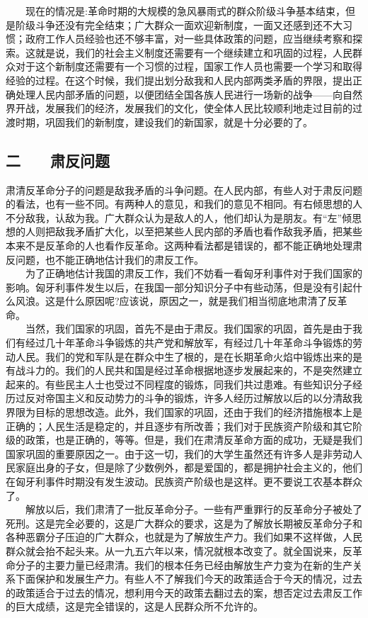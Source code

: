 \documentclass[cn,11pt,chinese]{elegantbook}
\def\myformat#1{\hfil\hfil #1}
\begin{document}
　　现在的情况是:革命时期的大规模的急风暴雨式的群众阶级斗争基本结束，但是阶级斗争还没有完全结束；广大群众一面欢迎新制度，一面又还感到还不大习惯；政府工作人员经验也还不够丰富，对一些具体政策的问题，应当继续考察和探索。这就是说，我们的社会主义制度还需要有一个继续建立和巩固的过程，人民群众对于这个新制度还需要有一个习惯的过程，国家工作人员也需要一个学习和取得经验的过程。在这个时候，我们提出划分敌我和人民内部两类矛盾的界限，提出正确处理人民内部矛盾的问题，以便团结全国各族人民进行一场新的战争——向自然界开战，发展我们的经济，发展我们的文化，使全体人民比较顺利地走过目前的过渡时期，巩固我们的新制度，建设我们的新国家，就是十分必要的了。\\
\subsection*{\myformat{二　　肃反问题}}
肃清反革命分子的问题是敌我矛盾的斗争问题。在人民内部，有些人对于肃反问题的看法，也有一些不同。有两种人的意见，和我们的意见不相同。有右倾思想的人不分敌我，认敌为我。广大群众认为是敌人的人，他们却认为是朋友。有“左”倾思想的人则把敌我矛盾扩大化，以至把某些人民内部的矛盾也看作敌我矛盾，把某些本来不是反革命的人也看作反革命。这两种看法都是错误的，都不能正确地处理肃反问题，也不能正确地估计我们的肃反工作。\\
　　为了正确地估计我国的肃反工作，我们不妨看一看匈牙利事件对于我们国家的影响。匈牙利事件发生以后，在我国一部分知识分子中有些动荡，但是没有引起什么风浪。这是什么原因呢?应该说，原因之一，就是我们相当彻底地肃清了反革命。\\
　　当然，我们国家的巩固，首先不是由于肃反。我们国家的巩固，首先是由于我们有经过几十年革命斗争锻炼的共产党和解放军，有经过几十年革命斗争锻炼的劳动人民。我们的党和军队是在群众中生了根的，是在长期革命火焰中锻炼出来的是有战斗力的。我们的人民共和国是经过革命根据地逐步发展起来的，不是突然建立起来的。有些民主人士也受过不同程度的锻炼，同我们共过患难。有些知识分子经历过反对帝国主义和反动势力的斗争的锻炼，许多人经历过解放以后的以分清敌我界限为目标的思想改造。此外，我们国家的巩固，还由于我们的经济措施根本上是正确的；人民生活是稳定的，并且逐步有所改善；我们对于民族资产阶级和其它阶级的政策，也是正确的，等等。但是，我们在肃清反革命方面的成功，无疑是我们国家巩固的重要原因之一。由于这一切，我们的大学生虽然还有许多人是非劳动人民家庭出身的子女，但是除了少数例外，都是爱国的，都是拥护社会主义的，他们在匈牙利事件时期没有发生波动。民族资产阶级也是这样。更不要说工农基本群众了。\\
　　解放以后，我们肃清了一批反革命分子。一些有严重罪行的反革命分子被处了死刑。这是完全必要的，这是广大群众的要求，这是为了解放长期被反革命分子和各种恶霸分子压迫的广大群众，也就是为了解放生产力。我们如果不这样做，人民群众就会抬不起头来。从一九五六年以来，情况就根本改变了。就全国说来，反革命分子的主要力量已经肃清。我们的根本任务已经由解放生产力变为在新的生产关系下面保护和发展生产力。有些人不了解我们今天的政策适合于今天的情况，过去的政策适合于过去的情况，想利用今天的政策去翻过去的案，想否定过去肃反工作的巨大成绩，这是完全错误的，这是人民群众所不允许的。\\
\end{document}
